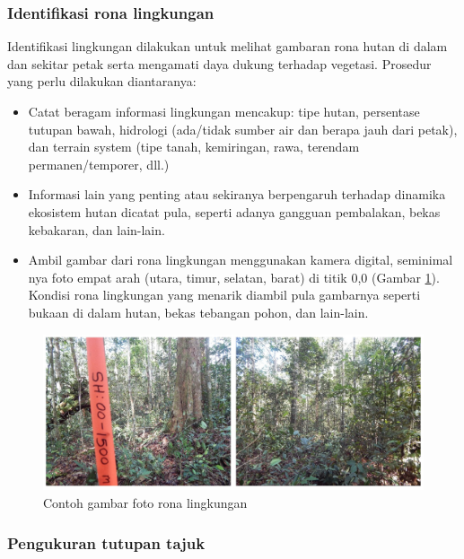 \documentclass[
]{book}
\providecommand{\tightlist}{%
  \setlength{\itemsep}{0pt}\setlength{\parskip}{0pt}}
\begin{document}
\hypertarget{identifikasi-rona-lingkungan}{%
\subsubsection*{Identifikasi rona lingkungan}\label{identifikasi-rona-lingkungan}}

Identifikasi lingkungan dilakukan untuk melihat gambaran rona hutan di dalam dan sekitar petak serta mengamati daya dukung terhadap vegetasi. Prosedur yang perlu dilakukan diantaranya:

\begin{itemize}
\tightlist
\item
  Catat beragam informasi lingkungan mencakup: tipe hutan, persentase tutupan bawah, hidrologi (ada/tidak sumber air dan berapa jauh dari petak), dan terrain system (tipe tanah, kemiringan, rawa, terendam permanen/temporer, dll.)
\item
  Informasi lain yang penting atau sekiranya berpengaruh terhadap dinamika ekosistem hutan dicatat pula, seperti adanya gangguan pembalakan, bekas kebakaran, dan lain-lain.
\item
  Ambil gambar dari rona lingkungan menggunakan kamera digital, seminimal nya foto empat arah (utara, timur, selatan, barat) di titik 0,0 (Gambar \ref{fig:figrlv}). Kondisi rona lingkungan yang menarik diambil pula gambarnya seperti bukaan di dalam hutan, bekas tebangan pohon, dan lain-lain.
\end{itemize}

\begin{figure}

{\centering \includegraphics[width=1\linewidth]{images/rlv_ilustration} 

}

\caption{Contoh gambar foto rona lingkungan}\label{fig:figrlv}
\end{figure}

\hypertarget{pengukuran-tutupan-tajuk}{%
\subsubsection*{Pengukuran tutupan tajuk}\label{pengukuran-tutupan-tajuk}}
\end{document}
